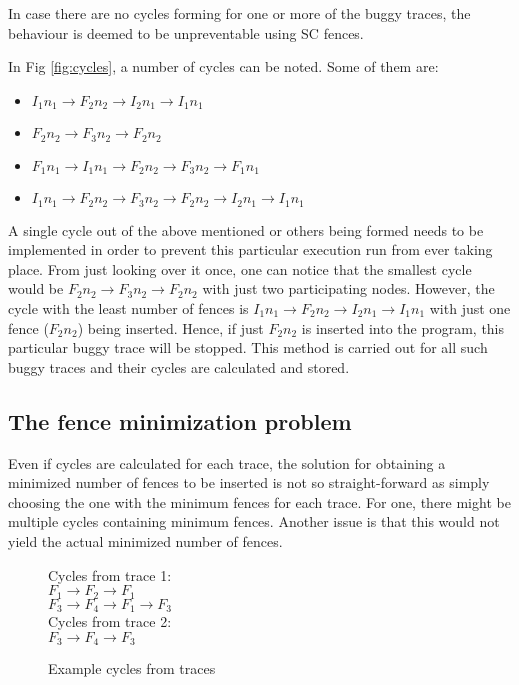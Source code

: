 In case there are no cycles forming for one or more of the buggy traces, the behaviour is deemed to be unpreventable using SC fences. 

\par
In Fig \ref{fig:cycles}, a number of cycles can be noted. Some of them are:
\begin{itemize}
\item \textit{$I_1n_1 \rightarrow F_2n_2 \rightarrow I_2n_1 \rightarrow I_1n_1$}
\item \textit{$F_2n_2 \rightarrow F_3n_2 \rightarrow F_2n_2$}
\item \textit{$F_1n_1 \rightarrow I_1n_1 \rightarrow F_2n_2 \rightarrow F_3n_2 \rightarrow F_1n_1$}
\item \textit{$I_1n_1 \rightarrow F_2n_2 \rightarrow F_3n_2 \rightarrow F_2n_2 \rightarrow I_2n_1 \rightarrow I_1n_1$}
\end{itemize} 
A single cycle out of the above mentioned or others being formed needs to be implemented in order to prevent this particular execution run from ever taking place. From just looking over it once, one can notice that the smallest cycle would be \textit{$F_2n_2 \rightarrow F_3n_2 \rightarrow F_2n_2$} with just two participating nodes. However, the cycle with the least number of fences is \textit{$I_1n_1 \rightarrow F_2n_2 \rightarrow I_2n_1 \rightarrow I_1n_1$} with just one fence (\textit{$F_2n_2$}) being inserted. Hence, if just \textit{$F_2n_2$} is inserted into the program, this particular buggy trace will be stopped. This method is carried out for all such buggy traces and their cycles are calculated and stored.

\subsection{The fence minimization problem}
\par
Even if cycles are calculated for each trace, the solution for obtaining a minimized number of fences to be inserted is not so straight-forward as simply choosing the one with the minimum fences for each trace. For one, there might be multiple cycles containing minimum fences. Another issue is that this would not yield the actual minimized number of fences. 

\begin{figure}
\begin{center}
	Cycles from trace 1:\\
	\textit{$F_1 \rightarrow F_2 \rightarrow F_1$}\\
	\textit{$F_3 \rightarrow F_4 \rightarrow F_1 \rightarrow F_3$}\\
	Cycles from trace 2:\\
	\textit{$F_3 \rightarrow F_4 \rightarrow F_3$}
	\caption{Example cycles from traces}
	\label{fig:fence_min}
\end{center}
\end{figure}

